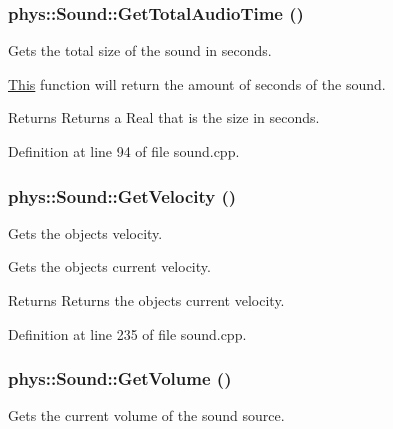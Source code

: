 \hypertarget{classphys_1_1Sound_a2c3864cbc6c25cd9a47529c75dea142b}{
\subsubsection[{GetTotalAudioTime}]{ phys::Sound::GetTotalAudioTime ()}}
\label{dc/d2f/classphys_1_1Sound_a2c3864cbc6c25cd9a47529c75dea142b}


Gets the total size of the sound in seconds. 

\hyperlink{structThis}{This} function will return the amount of seconds of the sound. \begin{DoxyReturn}{Returns}
Returns a Real that is the size in seconds. 
\end{DoxyReturn}


Definition at line 94 of file sound.cpp.

\hypertarget{classphys_1_1Sound_a48e996b687ec11ff1d19400a010c4f07}{
\subsubsection[{GetVelocity}]{ phys::Sound::GetVelocity ()}}
\label{dc/d2f/classphys_1_1Sound_a48e996b687ec11ff1d19400a010c4f07}


Gets the objects velocity. 

Gets the objects current velocity. \begin{DoxyReturn}{Returns}
Returns the objects current velocity. 
\end{DoxyReturn}


Definition at line 235 of file sound.cpp.

\hypertarget{classphys_1_1Sound_ad386c2247f87d4b57bfae2c722282417}{
\subsubsection[{GetVolume}]{ phys::Sound::GetVolume ()}}
\label{dc/d2f/classphys_1_1Sound_ad386c2247f87d4b57bfae2c722282417}


Gets the current volume of the sound source. 

